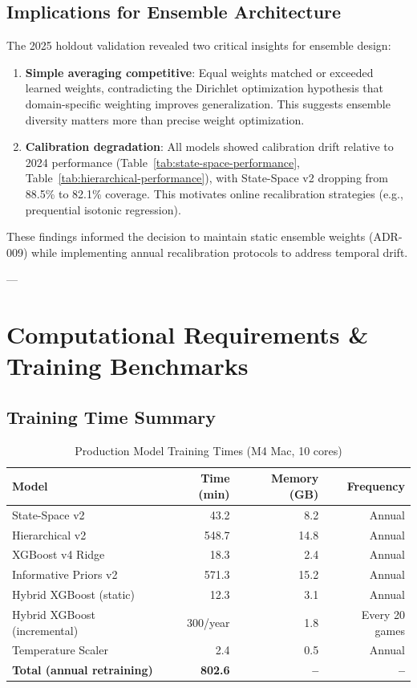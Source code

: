 \subsection{Implications for Ensemble Architecture}

The 2025 holdout validation revealed two critical insights for ensemble design:

\begin{enumerate}
\item \textbf{Simple averaging competitive}: Equal weights matched or exceeded learned weights, contradicting the Dirichlet optimization hypothesis that domain-specific weighting improves generalization. This suggests ensemble diversity matters more than precise weight optimization.

\item \textbf{Calibration degradation}: All models showed calibration drift relative to 2024 performance (Table~\ref{tab:state-space-performance}, Table~\ref{tab:hierarchical-performance}), with State-Space v2 dropping from 88.5\% to 82.1\% coverage. This motivates online recalibration strategies (e.g., prequential isotonic regression).
\end{enumerate}

These findings informed the decision to maintain static ensemble weights (ADR-009) while implementing annual recalibration protocols to address temporal drift.

---

\section{Computational Requirements \& Training Benchmarks}

\subsection{Training Time Summary}

\begin{table}[htbp]
\centering
\caption{Production Model Training Times (M4 Mac, 10 cores)}
\label{tab:training-times}
\begin{tabular}{lrrr}
\toprule
\textbf{Model} & \textbf{Time (min)} & \textbf{Memory (GB)} & \textbf{Frequency} \\
\midrule
State-Space v2 & 43.2 & 8.2 & Annual \\
Hierarchical v2 & 548.7 & 14.8 & Annual \\
XGBoost v4 Ridge & 18.3 & 2.4 & Annual \\
Informative Priors v2 & 571.3 & 15.2 & Annual \\
Hybrid XGBoost (static) & 12.3 & 3.1 & Annual \\
Hybrid XGBoost (incremental) & ~300/year & 1.8 & Every 20 games \\
Temperature Scaler & 2.4 & 0.5 & Annual \\
\midrule
\textbf{Total (annual retraining)} & \textbf{802.6} & \textbf{--} & \textbf{--} \\
\bottomrule
\end{tabular}
\end{table}


